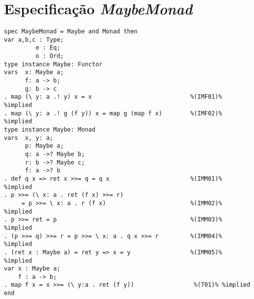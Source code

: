 \section{Especificação \textit{MaybeMonad}}
\label{appendix:strictSpec:maybeMonad}
\begin{Verbatim}
spec MaybeMonad = Maybe and Monad then
var a,b,c : Type;
         e : Eq;
         o : Ord;
type instance Maybe: Functor
vars  x: Maybe a;
      f: a -> b;
      g: b -> c
. map (\ y: a .! y) x = x                            %(IMF01)% %implied
. map (\ y: a .! g (f y)) x = map g (map f x)        %(IMF02)% %implied
type instance Maybe: Monad
vars  x, y: a;
      p: Maybe a;
      q: a ->? Maybe b;
      r: b ->? Maybe c;
      f: a ->? b
. def q x => ret x >>= q = q x                       %(IMM01)% %implied
. p >>= (\ x: a . ret (f x) >>= r)
     = p >>= \ x: a . r (f x)                        %(IMM02)% %implied
. p >>= ret = p                                      %(IMM03)% %implied
. (p >>= q) >>= r = p >>= \ x: a . q x >>= r         %(IMM04)% %implied
. (ret x : Maybe a) = ret y => x = y                 %(IMM05)% %implied
var x : Maybe a;
    f : a -> b;
. map f x = x >>= (\ y:a . ret (f y))                 %(T01)% %implied
end
\end{Verbatim}

